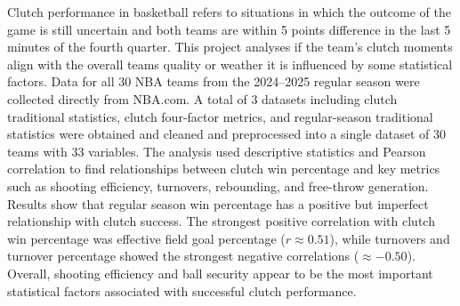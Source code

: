 Clutch performance in basketball refers to situations in which the outcome of the game is still uncertain and both teams 
are within 5 points difference in the last 5 minutes of the fourth quarter. This project analyses if the team’s clutch 
moments align with the overall teams quality or weather it is influenced by some statistical factors. Data for all 
30 NBA teams from the 2024–2025 regular season were collected directly from NBA.com.  A total of 3 datasets including 
clutch traditional statistics, clutch four-factor metrics, and regular-season traditional statistics were obtained and 
cleaned and preprocessed into a single dataset of 30 teams with 33 variables. The analysis used descriptive statistics 
and Pearson correlation to find relationships between clutch win percentage and key metrics such as shooting efficiency, 
turnovers, rebounding, and free-throw generation. Results show that regular season win percentage has a positive but 
imperfect relationship with clutch success. The strongest positive correlation with clutch win percentage was effective 
field goal percentage ($r \approx 0.51$), while turnovers and turnover percentage showed the strongest negative correlations
($\approx -0.50$). Overall, shooting efficiency and ball security appear to be the most important statistical factors associated 
with successful clutch performance.